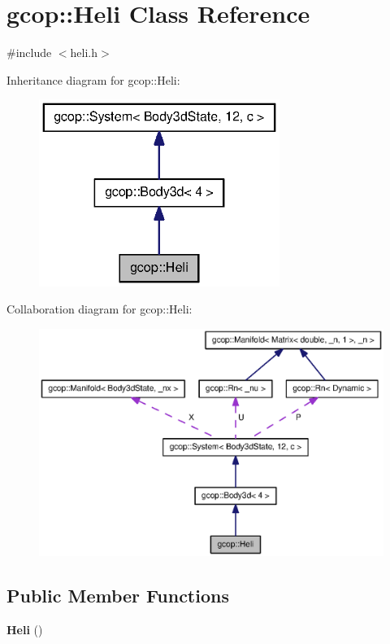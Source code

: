 \section{gcop\-:\-:\-Heli \-Class \-Reference}
\label{classgcop_1_1Heli}


{\ttfamily \#include $<$heli.\-h$>$}



\-Inheritance diagram for gcop\-:\-:\-Heli\-:
\nopagebreak
\begin{figure}[H]
\begin{center}
\leavevmode
\includegraphics[width=222pt]{classgcop_1_1Heli__inherit__graph}
\end{center}
\end{figure}


\-Collaboration diagram for gcop\-:\-:\-Heli\-:
\nopagebreak
\begin{figure}[H]
\begin{center}
\leavevmode
\includegraphics[width=350pt]{classgcop_1_1Heli__coll__graph}
\end{center}
\end{figure}
\subsection*{\-Public \-Member \-Functions}
\begin{DoxyCompactItemize}
\item 
{\bf \-Heli} ()
\end{DoxyCompactItemize}
